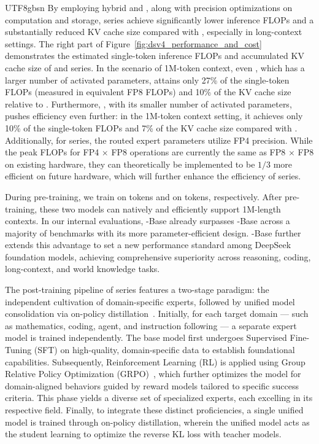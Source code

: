 \begin{CJK*}{UTF8}{gbsn}
By employing hybrid \csa{} and \hca{}, along with precision optimizations on computation and storage, \dsviv{} series achieve significantly lower inference FLOPs and a substantially reduced KV cache size compared with \dsviiiII{}, especially in long-context settings. 
The right part of Figure~\ref{fig:dsv4_performance_and_cost} demonstrates the estimated single-token inference FLOPs and accumulated KV cache size of \dsviiiII{} and \dsviv{} series.
In the scenario of 1M-token context, even \dsvivp{}, which has a larger number of activated parameters, attains only 27\% of the single-token FLOPs (measured in equivalent FP8 FLOPs) and 10\% of the KV cache size relative to \dsviiiII{}. 
Furthermore, \dsvivf{}, with its smaller number of activated parameters, pushes efficiency even further: in the 1M-token context setting, it achieves only 10\% of the single-token FLOPs and 7\% of the KV cache size compared with \dsviiiII{}. 
Additionally, for \dsviv{} series, the routed expert parameters utilize FP4 precision. 
While the peak FLOPs for FP4 $\times$ FP8 operations are currently the same as FP8 $\times$ FP8 on existing hardware, they can theoretically be implemented to be $1/3$ more efficient on future hardware, which will further enhance the efficiency of \dsviv{} series.

During pre-training, we train \dsvivf{} on \dsvivftoken{} tokens and \dsvivp{} on \dsvivptoken{} tokens, respectively. 
After pre-training, these two models can natively and efficiently support 1M-length contexts. 
In our internal evaluations, \dsvivf{}-Base already surpasses \dsviiiII{}-Base across a majority of benchmarks with its more parameter-efficient design. 
\dsvivp{}-Base further extends this advantage to set a new performance standard among DeepSeek foundation models, achieving comprehensive superiority across reasoning, coding, long-context, and world knowledge tasks.

The post-training pipeline of \dsviv{} series features a two-stage paradigm: the independent cultivation of domain-specific experts, followed by unified model consolidation via on-policy distillation~\citep{lu2025onpolicydistillation,minillm}. 
Initially, for each target domain --- such as mathematics, coding, agent, and instruction following --- a separate expert model is trained independently. 
The base model first undergoes Supervised Fine-Tuning (SFT) on high-quality, domain-specific data to establish foundational capabilities. 
Subsequently, Reinforcement Learning (RL) is applied using Group Relative Policy Optimization (GRPO)~\citep{dsr1}, which further optimizes the model for domain-aligned behaviors guided by reward models tailored to specific success criteria. 
This phase yields a diverse set of specialized experts, each excelling in its respective field. 
Finally, to integrate these distinct proficiencies, a single unified model is trained through on-policy distillation, wherein the unified model acts as the student learning to optimize the reverse KL loss with teacher models.


\end{CJK*}

